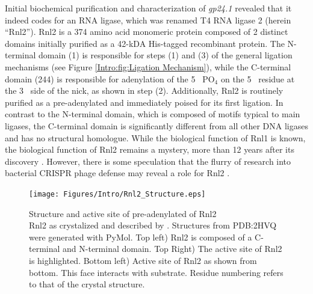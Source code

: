     Initial biochemical purification and characterization of \textit{gp24.1} \citep{Ho2002b} revealed that it indeed codes for an RNA ligase, which was renamed T4 RNA ligase 2 (herein ``Rnl2''). Rnl2 is a 374 amino acid monomeric protein composed of 2 distinct domains initially purified as a 42-kDA His-tagged recombinant protein. The N-terminal domain (1) is responsible for steps (1) and (3) of the general ligation mechanisms (see Figure \ref{Intro:fig:Ligation Mechanism}), while the C-terminal domain (244) is responsible for adenylation of the 5\textprime~ PO$_{4}$ on the 5\textprime~ residue at the 3\textprime~ side of the nick, as shown in step (2). Additionally, Rnl2 is routinely purified as a pre-adenylated and immediately poised for its first ligation. In contrast to the N-terminal domain, which is composed of motifs typical to main ligases, the C-terminal domain is significantly  different from all other DNA ligases and has no structural homologue. While the biological function of Rnl1 is known, the biological function of Rnl2 remains a mystery, more than 12 years after its discovery \citep{Chauleau2013b}. However, there is some speculation that the flurry of research into bacterial CRISPR phage defense may reveal a role for Rnl2 \citep{Barrangou2007c,Chauleau2013b}.

    \begin{figure} %
      \centering 
      \texttt{[image: Figures/Intro/Rnl2\_Structure.eps]}
      \caption[Structure and active site of pre-adenylated of Rnl2]
      {
        Structure and active site of pre-adenylated of Rnl2\\[0.25cm]
        Rnl2 as crystalized and described by \citep{Nandakumar2006}. Structures from PDB:2HVQ were generated with PyMol. Top left) Rnl2 is composed of a C-terminal and N-terminal domain. Top Right) The active site of Rnl2 is highlighted. Bottom left) Active site of Rnl2 as shown from bottom. This face interacts with substrate. Residue numbering refers to that of the crystal structure.
        }
      \label{Intro:fig:Rnl2 General Structure}
      \end{figure}

